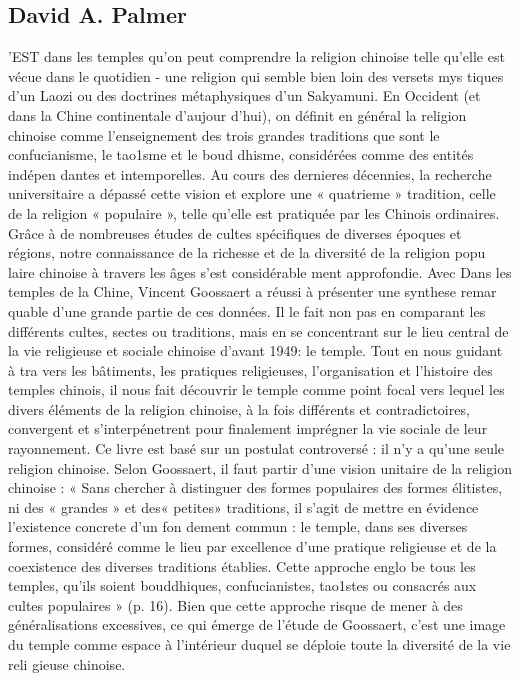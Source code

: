 \subsection{David A. Palmer}

'EST dans les temples qu'on peut comprendre la religion chinoise telle qu'elle est vécue dans le quotidien
- une religion qui semble bien loin des versets mys  tiques d'un Laozi ou des
doctrines métaphysiques d'un Sakyamuni. En Occident (et dans la Chine continentale d'aujour  d'hui), on définit en général la religion chinoise comme l'enseignement des trois grandes traditions que sont le confucianisme, le tao1sme et le boud  dhisme, considérées comme des entités indépen  dantes et intemporelles. Au cours des dernieres décennies, la recherche universitaire a dépassé cette vision et explore une « quatrieme » tradition, celle de la religion « populaire », telle qu'elle est pratiquée par les Chinois ordinaires. Grâce à de nombreuses études de cultes spécifiques de diverses époques et régions, notre connaissance de la richesse et de la diversité de la religion popu  laire chinoise à travers les âges s'est considérable  ment approfondie.
Avec Dans les temples de la Chine, Vincent Goossaert a réussi à présenter une synthese remar  quable d'une grande partie de ces données. Il le fait non pas en comparant les différents cultes, sectes ou traditions, mais en se concentrant sur le lieu central de la vie religieuse et sociale chinoise d'avant 1949: le temple. Tout en nous guidant à tra  vers les bâtiments, les pratiques religieuses, l'organisation et l'histoire des temples chinois, il nous fait découvrir le temple comme point focal vers lequel les divers éléments de la religion chinoise, à la fois différents et contradictoires, convergent et s'interpénetrent pour finalement imprégner la vie sociale de leur rayonnement.
Ce livre est basé sur un postulat controversé : il
n'y a qu'une seule religion chinoise. Selon
Goossaert, il faut partir d'une vision unitaire de la religion chinoise : « Sans chercher à distinguer des formes populaires des formes élitistes, ni des
« grandes » et des« petites» traditions, il s'agit de mettre en évidence l'existence concrete d'un fon  dement commun : le temple, dans ses diverses formes, considéré comme le lieu par excellence d'une pratique religieuse et de la coexistence des diverses traditions établies. Cette approche englo  be tous les temples, qu'ils soient bouddhiques, confucianistes, tao1stes ou consacrés aux cultes populaires » (p. 16). Bien que cette approche risque de mener à des généralisations excessives, ce qui émerge de l'étude de Goossaert, c'est une image du temple comme espace à l'intérieur duquel se déploie toute la diversité de la vie reli  gieuse chinoise.
